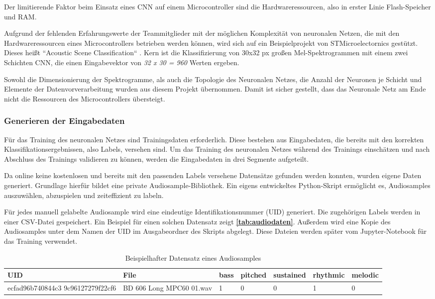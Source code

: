 Der limitierende Faktor beim Einsatz eines CNN auf einem Microcontroller sind die Hardwareressourcen, also in erster Linie Flash-Speicher und RAM.

Aufgrund der fehlenden Erfahrungswerte der Teammitglieder mit der möglichen Komplexität von neuronalen Netzen, die mit den Hardwareressourcen eines Microcontrollers betrieben werden können, wird sich auf ein Beispielprojekt von STMicroelectornics gestützt. Dieses heißt ``Acoustic Scene Classification`` \cite{stm-asc}\cite{stm-asc-2}. Kern ist die Klassifizierung von 30x32 px großen Mel-Spektrogrammen mit einem zwei Schichten CNN, die einen Eingabevektor von \textit{32 x 30 = 960} Werten ergeben. 

Sowohl die Dimensionierung der Spektrogramme, als auch die Topologie des Neuronalen Netzes, die Anzahl der Neuronen je Schicht und Elemente der Datenvorverarbeitung wurden aus diesem Projekt übernommen. Damit ist sicher gestellt, dass das Neuronale Netz am Ende nicht die Ressourcen des Microcontrollers übersteigt.

\subsubsection{Generieren der Eingabedaten}
\label{sec:input-data-generation}
Für das Training des neuronalen Netzes sind Trainingsdaten erforderlich. Diese bestehen aus Eingabedaten, die bereits mit den korrekten Klassifikationsergebnissen, also Labels, versehen sind. Um das Training des neuronalen Netzes während des Trainings einschätzen und nach Abschluss des Trainings validieren zu können, werden die Eingabedaten in drei Segmente aufgeteilt.

Da online keine kostenlosen und bereits mit den passenden Labels versehene Datensätze gefunden werden konnten, wurden eigene Daten generiert. Grundlage hierfür bildet eine private Audiosample-Bibliothek. Ein eigens entwickeltes Python-Skript ermöglicht es, Audiosamples auszuwählen, abzuspielen und zeiteffizient zu labeln.

Für jedes manuell gelabelte Audiosample wird eine eindeutige Identifikationsnummer (UID) generiert. Die zugehörigen Labels werden in einer CSV-Datei gespeichert. Ein Beispiel für einen solchen Datensatz zeigt \textbf{\autoref{tab:audiodaten}}. Außerdem wird eine Kopie des Audiosamples unter dem Namen der UID im Ausgabeordner des Skripts abgelegt. Diese Dateien werden später vom Jupyter-Notebook für das Training verwendet.

\begin{table}[h!]
\centering
\begin{tabular}{|m{2.8cm}|m{4.5cm}|m{0.8cm}|m{1.2cm}|m{1.5cm}|m{1.5cm}|m{1.3cm}|}
\hline
\textbf{UID} & \textbf{File} & \textbf{bass} & \textbf{pitched} & \textbf{sustained} & \textbf{rhythmic} & \textbf{melodic} \\ \hline
ecfad96b740844c3
9c96127279f22cf6 &  BD 606 Long MPC60 01.wav & 1 & 0 & 0 & 1 & 0 \\ \hline
\end{tabular}
\caption{Beispielhafter Datensatz eines Audiosamples}
\label{tab:audiodaten}
\end{table}


